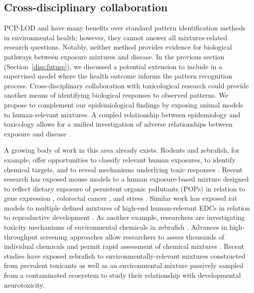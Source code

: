 \subsection{Cross-disciplinary collaboration}
PCP-LOD and \bnmf have many benefits over standard pattern identification methods in environmental health; however, they cannot answer all mixtures-related research questions. Notably, neither method provides evidence for biological pathways between exposure mixtures and disease. In the previous section (Section~\ref{diss:future}), we discussed a potential extension to include \bnmf in a supervised model where the health outcome informs the pattern recognition process. Cross-disciplinary collaboration with toxicological research could provide another means of identifying biological responses to observed patterns. We propose to complement our epidemiological findings by exposing animal models to human-relevant mixtures. A coupled relationship between epidemiology and toxicology allows for a unified investigation of adverse relationships between exposure and disease \cite{adami2011toxicology}.

A growing body of work in this area already exists. Rodents and zebrafish, for example, offer opportunities to classify relevant human exposures, to identify chemical targets, and to reveal mechanisms underlying toxic responses \cite{vaz2019zebrafish}. Recent research has exposed mouse models to a human exposure-based mixture designed to reflect dietary exposure of persistent organic pollutants (POPs) in relation to gene expression \cite{myhre2021maternal}, colorectal cancer \cite{johanson2020maternal}, and stress \cite{hudecova2018human, berntsen2017design}. Similar work has exposed rat models to multiple defined mixtures of high-end human-relevant EDCs in relation to reproductive development \cite{johansson2020calretinin, isling2014late, axelstad2018edc, johansson2016perinatal, ramhoj2018perfluorohexane, christiansen2012mixtures, axelstad2014mixtures}. As another example, researchers are investigating toxicity mechanisms of environmental chemicals in zebrafish \cite{vaz2019zebrafish}. Advances in high-throughput screening approaches allow researchers to assess thousands of individual chemicals and permit rapid assessment of chemical mixtures \cite{tanguay2018rise}. Recent studies have exposed zebrafish to environmentally-relevant mixtures constructed from prevalent toxicants \cite{geier2018systematic} as well as an environmental mixture passively sampled from a contaminated ecosystem \cite{bergmann2017using, allan2012bridging} to study their relationship with developmental neurotoxicity.

